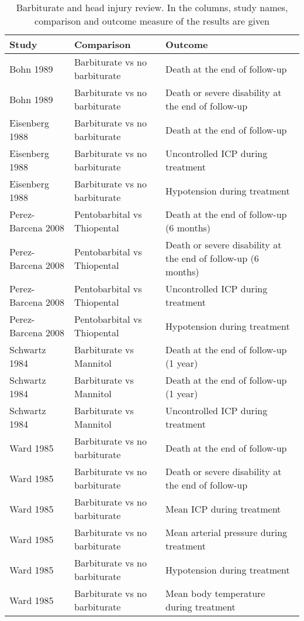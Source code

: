 \begin{table}[ht]
\centering
\begingroup\footnotesize
\begin{tabular}{lll}
  \hline
Study & Comparison & Outcome \\ 
  \hline
Bohn 1989 & Barbiturate vs no barbiturate & Death at the end of follow-up \\ 
  Bohn 1989 & Barbiturate vs no barbiturate & Death or severe disability at the end of follow-up \\ 
  Eisenberg 1988 & Barbiturate vs no barbiturate & Death at the end of follow-up \\ 
  Eisenberg 1988 & Barbiturate vs no barbiturate & Uncontrolled ICP during treatment \\ 
  Eisenberg 1988 & Barbiturate vs no barbiturate & Hypotension during treatment \\ 
  Perez-Barcena 2008 & Pentobarbital vs Thiopental & Death at the end of follow-up (6 months) \\ 
  Perez-Barcena 2008 & Pentobarbital vs Thiopental & Death or severe disability at the end of follow-up (6 months) \\ 
  Perez-Barcena 2008 & Pentobarbital vs Thiopental & Uncontrolled ICP during treatment \\ 
  Perez-Barcena 2008 & Pentobarbital vs Thiopental & Hypotension during treatment \\ 
  Schwartz 1984 & Barbiturate vs Mannitol & Death at the end of follow-up (1 year) \\ 
  Schwartz 1984 & Barbiturate vs Mannitol & Death at the end of follow-up (1 year) \\ 
  Schwartz 1984 & Barbiturate vs Mannitol & Uncontrolled ICP during treatment \\ 
  Ward 1985 & Barbiturate vs no barbiturate & Death at the end of follow-up \\ 
  Ward 1985 & Barbiturate vs no barbiturate & Death or severe disability at the end of follow-up \\ 
  Ward 1985 & Barbiturate vs no barbiturate & Mean ICP during treatment \\ 
  Ward 1985 & Barbiturate vs no barbiturate & Mean arterial pressure during treatment \\ 
  Ward 1985 & Barbiturate vs no barbiturate & Hypotension during treatment \\ 
  Ward 1985 & Barbiturate vs no barbiturate & Mean body temperature during treatment \\ 
   \hline
\end{tabular}
\endgroup
\caption{Barbiturate and head injury review. In the columns, study names, comparison and outcome measure of the results are given} 
\label{barbiturates}
\end{table}


